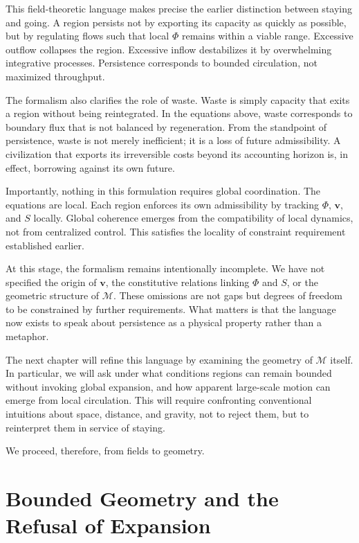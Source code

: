 \documentclass[12pt,oneside]{book}
\begin{document}
This field-theoretic language makes precise the earlier distinction between staying and going. A region persists not by exporting its capacity as quickly as possible, but by regulating flows such that local \(\Phi\) remains within a viable range. Excessive outflow collapses the region. Excessive inflow destabilizes it by overwhelming integrative processes. Persistence corresponds to bounded circulation, not maximized throughput.

The formalism also clarifies the role of waste. Waste is simply capacity that exits a region without being reintegrated. In the equations above, waste corresponds to boundary flux that is not balanced by regeneration. From the standpoint of persistence, waste is not merely inefficient; it is a loss of future admissibility. A civilization that exports its irreversible costs beyond its accounting horizon is, in effect, borrowing against its own future.

Importantly, nothing in this formulation requires global coordination. The equations are local. Each region enforces its own admissibility by tracking \(\Phi\), \(\mathbf{v}\), and \(S\) locally. Global coherence emerges from the compatibility of local dynamics, not from centralized control. This satisfies the locality of constraint requirement established earlier.

At this stage, the formalism remains intentionally incomplete. We have not specified the origin of \(\mathbf{v}\), the constitutive relations linking \(\Phi\) and \(S\), or the geometric structure of \(\mathcal{M}\). These omissions are not gaps but degrees of freedom to be constrained by further requirements. What matters is that the language now exists to speak about persistence as a physical property rather than a metaphor.

The next chapter will refine this language by examining the geometry of \(\mathcal{M}\) itself. In particular, we will ask under what conditions regions can remain bounded without invoking global expansion, and how apparent large-scale motion can emerge from local circulation. This will require confronting conventional intuitions about space, distance, and gravity, not to reject them, but to reinterpret them in service of staying.

We proceed, therefore, from fields to geometry.

\chapter{Bounded Geometry and the Refusal of Expansion}
\end{document}
